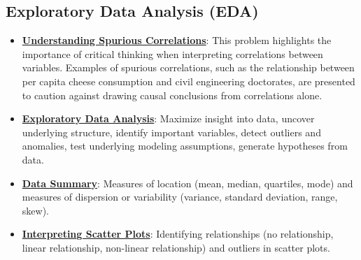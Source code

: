 \documentclass{article}%
\begin{document}
%
\subsection{Exploratory Data Analysis (EDA)}%
\label{subsec:ExploratoryDataAnalysis(EDA)}%
\begin{itemize}[leftmargin=*]%
\item \href{https://purdue.brightspace.com/d2l/common/assets/pdfjs-d2l-dist/1.0.14-legacy/web/viewer.html?file=\%2Fcontent\%2Fenforced\%2F1095465-WL.202510.CS24200.LE1\%2F09L1-IntroToVis.pdf\%3Fou\%3D1095465\&lang=en-us\&container=d2l-fileviewer-rendered-pdf\&fullscreen=d2l-fileviewer-rendered-pdf-dialog\&height=667#page=20}{\textbf{Understanding Spurious Correlations}}: This problem highlights the importance of critical thinking when interpreting correlations between variables. Examples of spurious correlations, such as the relationship between per capita cheese consumption and civil engineering doctorates, are presented to caution against drawing causal conclusions from correlations alone.%
\item \href{https://purdue.brightspace.com/d2l/common/assets/pdfjs-d2l-dist/1.0.14-legacy/web/viewer.html?file=\%2Fcontent\%2Fenforced\%2F1095465-WL.202510.CS24200.LE1\%2F10L2-Vis.pdf\%3Fou\%3D1095465\&lang=en-us\&container=d2l-fileviewer-rendered-pdf\&fullscreen=d2l-fileviewer-rendered-pdf-dialog\&height=667#page=3}{\textbf{Exploratory Data Analysis}}: Maximize insight into data, uncover underlying structure, identify important variables, detect outliers and anomalies, test underlying modeling assumptions, generate hypotheses from data.%
\item \href{https://purdue.brightspace.com/d2l/common/assets/pdfjs-d2l-dist/1.0.14-legacy/web/viewer.html?file=\%2Fcontent\%2Fenforced\%2F1095465-WL.202510.CS24200.LE1\%2F10L2-Vis.pdf\%3Fou\%3D1095465\&lang=en-us\&container=d2l-fileviewer-rendered-pdf\&fullscreen=d2l-fileviewer-rendered-pdf-dialog\&height=667#page=5}{\textbf{Data Summary}}: Measures of location (mean, median, quartiles, mode) and measures of dispersion or variability (variance, standard deviation, range, skew).%
\item \href{https://purdue.brightspace.com/d2l/common/assets/pdfjs-d2l-dist/1.0.14-legacy/web/viewer.html?file=\%2Fcontent\%2Fenforced\%2F1095465-WL.202510.CS24200.LE1\%2F10L2-Vis.pdf\%3Fou\%3D1095465\&lang=en-us\&container=d2l-fileviewer-rendered-pdf\&fullscreen=d2l-fileviewer-rendered-pdf-dialog\&height=667#page=12}{\textbf{Interpreting Scatter Plots}}: Identifying relationships (no relationship, linear relationship, non-linear relationship) and outliers in scatter plots.%

\end{itemize}
\end{document}
